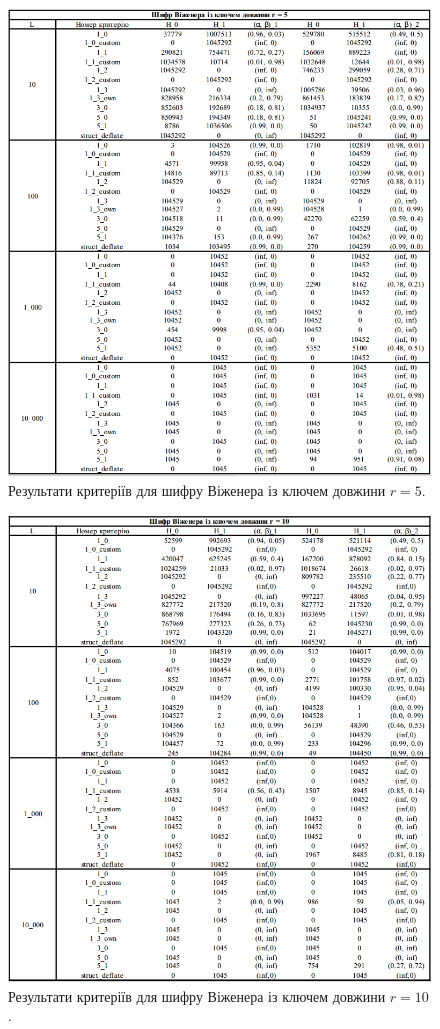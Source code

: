  \begin{figure}[!h]
    		\centering
    		\includegraphics[scale = 0.55]{Images/vingenere_r5.png}
    		\caption{Результати критеріїв для шифру Віженера із ключем довжини $r = 5$.}
    		\label{fig:vingenere_r5}
	\end{figure}
 \begin{figure}[!h]
    		\centering
    		\includegraphics[scale = 0.55]{Images/vingenere_r10.png}
    		\caption{Результати критеріїв для шифру Віженера із ключем довжини $r = 10$.}
    		\label{fig:vingenere_r10}
	\end{figure}
